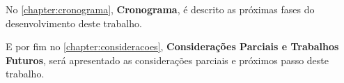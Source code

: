 \par
No \autoref{chapter:cronograma}, \textbf{Cronograma}, é descrito as próximas fases do desenvolvimento deste trabalho.

\par
E por fim no \autoref{chapter:consideracoes}, \textbf{Considerações Parciais e Trabalhos Futuros}, será apresentado as
considerações parciais e próximos passo deste trabalho.


